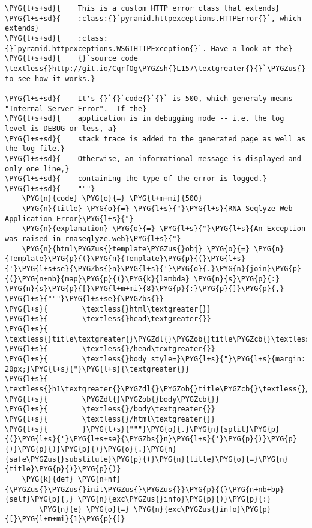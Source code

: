\begin{Verbatim}[commandchars=\\\{\}]
\PYG{l+s+sd}{    This is a custom HTTP error class that extends}
\PYG{l+s+sd}{    :class:{}`pyramid.httpexceptions.HTTPError{}`, which extends}
\PYG{l+s+sd}{    :class:{}`pyramid.httpexceptions.WSGIHTTPException{}`. Have a look at the}
\PYG{l+s+sd}{    {}`source code \textless{}http://git.io/CqrfOg\PYGZsh{}L157\textgreater{}{}`\PYGZus{} to see how it works.}

\PYG{l+s+sd}{    It's {}`{}`code{}`{}` is 500, which generaly means "Internal Server Error".  If the}
\PYG{l+s+sd}{    application is in debugging mode -- i.e. the log level is DEBUG or less, a}
\PYG{l+s+sd}{    stack trace is added to the generated page as well as the log file.}
\PYG{l+s+sd}{    Otherwise, an informational message is displayed and only one line,}
\PYG{l+s+sd}{    containing the type of the error is logged.}
\PYG{l+s+sd}{    """}
    \PYG{n}{code} \PYG{o}{=} \PYG{l+m+mi}{500}
    \PYG{n}{title} \PYG{o}{=} \PYG{l+s}{"}\PYG{l+s}{RNA-Seqlyze Web Application Error}\PYG{l+s}{"}
    \PYG{n}{explanation} \PYG{o}{=} \PYG{l+s}{"}\PYG{l+s}{An Exception was raised in rnaseqlyze.web}\PYG{l+s}{"}
    \PYG{n}{html\PYGZus{}template\PYGZus{}obj} \PYG{o}{=} \PYG{n}{Template}\PYG{p}{(}\PYG{n}{Template}\PYG{p}{(}\PYG{l+s}{'}\PYG{l+s+se}{\PYGZbs{}n}\PYG{l+s}{'}\PYG{o}{.}\PYG{n}{join}\PYG{p}{(}\PYG{n+nb}{map}\PYG{p}{(}\PYG{k}{lambda} \PYG{n}{s}\PYG{p}{:} \PYG{n}{s}\PYG{p}{[}\PYG{l+m+mi}{8}\PYG{p}{:}\PYG{p}{]}\PYG{p}{,} \PYG{l+s}{"""}\PYG{l+s+se}{\PYGZbs{}}
\PYG{l+s}{        \textless{}html\textgreater{}}
\PYG{l+s}{        \textless{}head\textgreater{}}
\PYG{l+s}{        \textless{}title\textgreater{}\PYGZdl{}\PYGZob{}title\PYGZcb{}\textless{}/title\textgreater{}}
\PYG{l+s}{        \textless{}/head\textgreater{}}
\PYG{l+s}{        \textless{}body style=}\PYG{l+s}{"}\PYG{l+s}{margin: 20px;}\PYG{l+s}{"}\PYG{l+s}{\textgreater{}}
\PYG{l+s}{        \textless{}h1\textgreater{}\PYGZdl{}\PYGZob{}title\PYGZcb{}\textless{}/h1\textgreater{}}
\PYG{l+s}{        \PYGZdl{}\PYGZob{}body\PYGZcb{}}
\PYG{l+s}{        \textless{}/body\textgreater{}}
\PYG{l+s}{        \textless{}/html\textgreater{}}
\PYG{l+s}{        }\PYG{l+s}{"""}\PYG{o}{.}\PYG{n}{split}\PYG{p}{(}\PYG{l+s}{'}\PYG{l+s+se}{\PYGZbs{}n}\PYG{l+s}{'}\PYG{p}{)}\PYG{p}{)}\PYG{p}{)}\PYG{p}{)}\PYG{o}{.}\PYG{n}{safe\PYGZus{}substitute}\PYG{p}{(}\PYG{n}{title}\PYG{o}{=}\PYG{n}{title}\PYG{p}{)}\PYG{p}{)}
    \PYG{k}{def} \PYG{n+nf}{\PYGZus{}\PYGZus{}init\PYGZus{}\PYGZus{}}\PYG{p}{(}\PYG{n+nb+bp}{self}\PYG{p}{,} \PYG{n}{exc\PYGZus{}info}\PYG{p}{)}\PYG{p}{:}
        \PYG{n}{e} \PYG{o}{=} \PYG{n}{exc\PYGZus{}info}\PYG{p}{[}\PYG{l+m+mi}{1}\PYG{p}{]}

\end{Verbatim}
